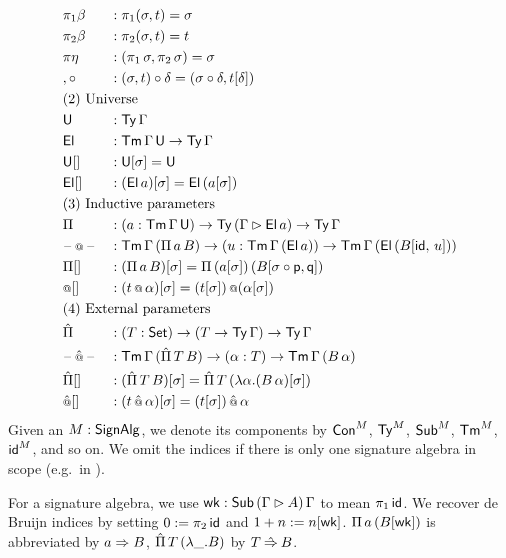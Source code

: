 \documentclass[a4paper,UKenglish,cleveref, autoref]{lipics-v2019}
\begin{document}
\begin{definition}
\begin{alignat*}{5}
  & {\pi_1\beta} && : \pi_1(\sigma, t) = \sigma \\
  & {\pi_2\beta} && : \pi_2(\sigma, t) = t \\
  & {\pi\eta} && : (\pi_1\,\sigma, \pi_2\,\sigma) = \sigma \\
  & {,\circ} && : (\sigma, t)\circ\delta = (\sigma\circ\delta, t[\delta]) \\
  & \rlap{(2) Universe} \\
  & \U && : \Ty\,\Gamma \\
  & \El && : \Tm\,\Gamma\,\U\ra\Ty\,\Gamma \\
  & {\U[]} && : \U[\sigma] = \U \\
  & {\El[]} && : (\El\,a)[\sigma] = \El\,(a[\sigma]) \\
  & \rlap{(3) Inductive parameters} \\
  & \Pi && : (a:\Tm\,\Gamma\,\U)\ra\Ty\,(\Gamma\ext\El\,a)\ra\Ty\,\Gamma \\
  & \blank\oldapp\blank && : \Tm\,\Gamma\,(\Pi\,a\,B)\ra (u : \Tm\,\Gamma\,(\El\,a))
  \ra \Tm\,\Gamma\,(\El\,(B[\id,\,u])) \\
  & {\Pi[]} && : (\Pi\,a\,B)[\sigma] = \Pi\,(a[\sigma])\,(B[\sigma\circ\p,\q]) \\
  & {\oldapp[]} && : (t\oldapp\alpha)[\sigma] = (t[\sigma])\mathop{\oldapp}(\alpha[\sigma]) \\
  & \rlap{(4) External parameters} \\
  & \Pim && : (T:\Set)\ra(T\ra\Ty\,\Gamma)\ra\Ty\,\Gamma \\
  & \blank\appm \blank && : \Tm\,\Gamma\,(\Pim\,T\,B)\ra(\alpha:T) \ra\Tm\,\Gamma\,(B\,\alpha) \\
  & {\Pim[]} && : (\Pim\,T\,B)[\sigma] = \Pim\,T\,(\lambda \alpha.(B\,\alpha)[\sigma]) \\
  & {\appm[]} && : (t\appm\alpha)[\sigma] = (t[\sigma])\mathop{\appm}\alpha
\end{alignat*}
Given an $M:\mathsf{SignAlg}$, we denote its components by $\mathsf{Con}^M$, $\mathsf{Ty}^M$,
$\mathsf{Sub}^M$, $\mathsf{Tm}^M$, $\mathsf{id}^M$, and so on. We omit the indices if there is
only one signature algebra in scope (e.g.\ in
).
\end{definition}

\begin{definition}[Abbreviations]\label{def:abbrevs}
  For a signature algebra, we use $\mathsf{wk} : \mathsf{Sub}\,(\Gamma\rhd A)\,\Gamma$
  to mean $\pi_1\,\mathsf{id}$. We recover de Bruijn indices by setting
  $0:= \pi_2 \,\mathsf{id}$ and $1+n := n[\mathsf{wk}]$. $\Pi\,a\,(B[\mathsf{wk}])$ is
  abbreviated by $a\Rightarrow B$, $\hat{\Pi}\,T\,(\lambda\_.B)$ by $T\mathbin{\hat{\Rightarrow}} B$.
\end{definition}
\end{document}
